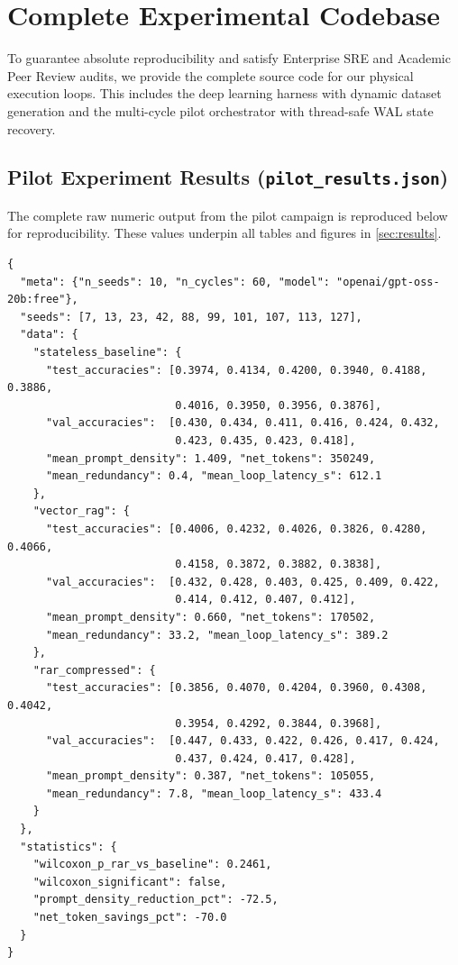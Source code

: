 \section{Complete Experimental Codebase}

To guarantee absolute reproducibility and satisfy Enterprise SRE and Academic Peer Review audits, we provide the complete source code for our physical execution loops. This includes the deep learning harness with dynamic dataset generation and the multi-cycle pilot orchestrator with thread-safe WAL state recovery.

\subsection{Pilot Experiment Results (\texttt{pilot\_results.json})}
\label{app:pilot_results}
The complete raw numeric output from the pilot campaign is reproduced below for reproducibility. These values underpin all tables and figures in \cref{sec:results}.

\begin{lstlisting}[language={},basicstyle=\ttfamily\tiny,
    caption={Raw pilot\_results.json output},label=lst:pilot_json]
{
  "meta": {"n_seeds": 10, "n_cycles": 60, "model": "openai/gpt-oss-20b:free"},
  "seeds": [7, 13, 23, 42, 88, 99, 101, 107, 113, 127],
  "data": {
    "stateless_baseline": {
      "test_accuracies": [0.3974, 0.4134, 0.4200, 0.3940, 0.4188, 0.3886,
                          0.4016, 0.3950, 0.3956, 0.3876],
      "val_accuracies":  [0.430, 0.434, 0.411, 0.416, 0.424, 0.432,
                          0.423, 0.435, 0.423, 0.418],
      "mean_prompt_density": 1.409, "net_tokens": 350249,
      "mean_redundancy": 0.4, "mean_loop_latency_s": 612.1
    },
    "vector_rag": {
      "test_accuracies": [0.4006, 0.4232, 0.4026, 0.3826, 0.4280, 0.4066,
                          0.4158, 0.3872, 0.3882, 0.3838],
      "val_accuracies":  [0.432, 0.428, 0.403, 0.425, 0.409, 0.422,
                          0.414, 0.412, 0.407, 0.412],
      "mean_prompt_density": 0.660, "net_tokens": 170502,
      "mean_redundancy": 33.2, "mean_loop_latency_s": 389.2
    },
    "rar_compressed": {
      "test_accuracies": [0.3856, 0.4070, 0.4204, 0.3960, 0.4308, 0.4042,
                          0.3954, 0.4292, 0.3844, 0.3968],
      "val_accuracies":  [0.447, 0.433, 0.422, 0.426, 0.417, 0.424,
                          0.437, 0.424, 0.417, 0.428],
      "mean_prompt_density": 0.387, "net_tokens": 105055,
      "mean_redundancy": 7.8, "mean_loop_latency_s": 433.4
    }
  },
  "statistics": {
    "wilcoxon_p_rar_vs_baseline": 0.2461,
    "wilcoxon_significant": false,
    "prompt_density_reduction_pct": -72.5,
    "net_token_savings_pct": -70.0
  }
}
\end{lstlisting}

